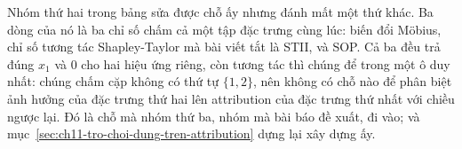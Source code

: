 Nhóm thứ hai trong bảng sửa được chỗ ấy nhưng đánh mất một thứ khác. Ba dòng
của nó là ba chỉ số chấm cả một tập đặc trưng cùng lúc: biến đổi Möbius, chỉ số
tương tác Shapley-Taylor mà bài viết tắt là STII, và SOP. Cả ba đều trả đúng
$x_1$ và $0$ cho hai hiệu ứng riêng, còn tương tác thì chúng để trong một ô duy nhất: chúng chấm cặp không có
thứ tự $\{1,2\}$, nên không có chỗ nào để phân biệt ảnh hưởng của đặc trưng thứ
hai lên attribution của đặc trưng thứ nhất với chiều ngược lại. Đó là chỗ mà
nhóm thứ ba, nhóm mà bài báo đề xuất, đi vào; và mục~\ref{sec:ch11-tro-choi-dung-tren-attribution}
dựng lại xây dựng ấy.
%
